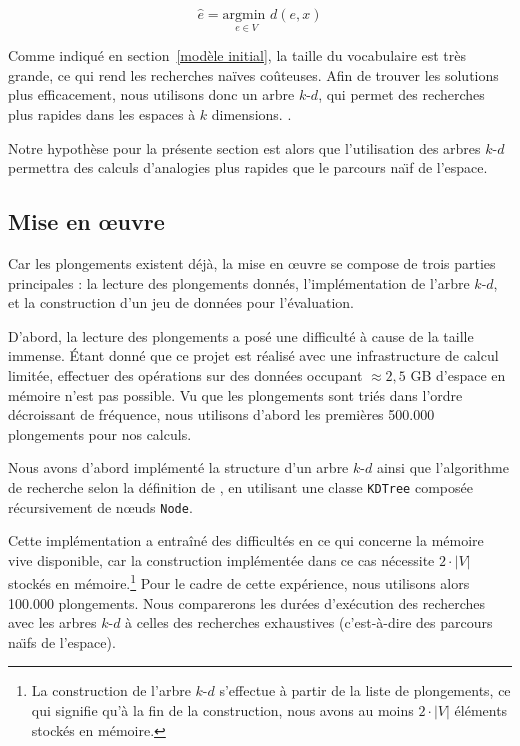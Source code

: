\documentclass[12pt]{article}
\begin{document}
\begin{equation}\label{eq:dist}
    \hat{e} = \underset{e \in V}{\text{argmin }} d(e, x)
\end{equation}

Comme indiqué en section~\ref{modèle initial}, la taille du vocabulaire est très grande, ce qui rend les recherches naïves coûteuses. Afin de trouver les solutions plus efficacement, nous utilisons donc un arbre $k$-$d$, qui permet des recherches plus rapides dans les espaces à $k$ dimensions. \citep{bentley1975multidimensional}. 

Notre hypothèse pour la présente section est alors que l'utilisation des arbres $k$-$d$ permettra des calculs d'analogies plus rapides que le parcours na\"\i f de l'espace.

\subsection{Mise en œuvre} \label{mise en œuvre-2}

Car les plongements existent déjà, la mise en œuvre se compose de trois parties principales : la lecture des plongements donnés, l'implémentation de l'arbre $k$-$d$, et la construction d'un jeu de données pour l'évaluation.

D'abord, la lecture des plongements a posé une difficulté à cause de la taille immense. Étant donné que ce projet est réalisé avec une infrastructure de calcul limitée, effectuer des opérations sur des données occupant $\approx 2{,}5$ GB d'espace en mémoire n'est pas possible. Vu que les plongements sont triés dans l'ordre décroissant de fréquence, nous utilisons d'abord les premières 500.000 plongements pour nos calculs.

Nous avons d'abord implémenté la structure d'un arbre $k$-$d$ ainsi que l'algorithme de recherche selon la définition de \cite{friedman1977algorithm}, en utilisant une classe \texttt{KDTree} composée récursivement de nœuds \texttt{Node}.

Cette implémentation a entraîné des difficultés en ce qui concerne la mémoire vive disponible, car la construction implémentée dans ce cas nécessite $2 \cdot |V|$ stockés en mémoire.\footnote{La construction de l'arbre $k$-$d$ s'effectue à partir de la liste de plongements, ce qui signifie qu'à la fin de la construction, nous avons au moins $2 \cdot |V|$ éléments stockés en mémoire.} Pour le cadre de cette expérience, nous utilisons alors 100.000 plongements. Nous comparerons les durées d'exécution des recherches avec les arbres $k$-$d$ à celles des recherches exhaustives (c'est-à-dire des parcours na\"\i fs de l'espace).
\end{document}
